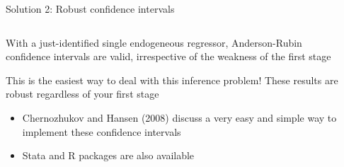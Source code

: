 \documentclass[notes,11pt, aspectratio=169]{beamer}
\newenvironment{wideitemize}{\itemize\addtolength{\itemsep}{10pt}}{\enditemize}
\begin{document}
\begin{frame}{Solution 2: Robust confidence intervals}
  \begin{columns}[T] %
    \begin{column}{0.5\textwidth}
      \begin{wideitemize}
      \item With a just-identified single endogeneous regressor,
        Anderson-Rubin confidence intervals are valid, irrespective of
        the weakness of the first stage
      \item This is the easiest way to deal with this inference
        problem! These results are robust regardless of your first
        stage
        \begin{itemize}
        \item Chernozhukov and Hansen (2008) discuss a very easy and simple way to implement these confidence intervals
        \item Stata and R packages are also available
        \end{itemize}
      \end{wideitemize}
    \end{column}
    \begin{column}{0.5\textwidth}

\end{column}
\end{columns}
\end{frame}
\end{document}
